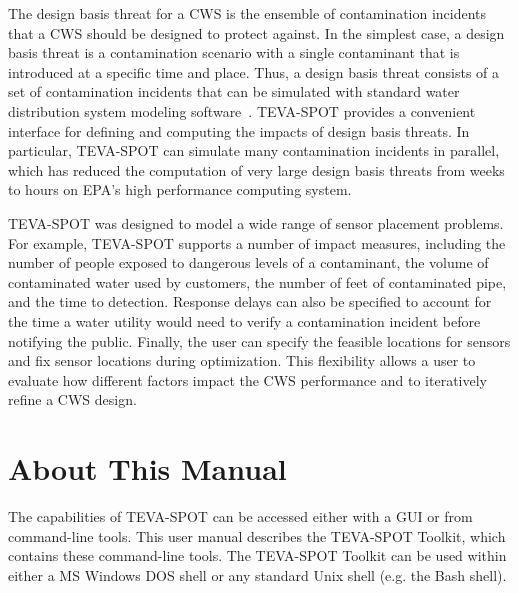 The design basis threat for a CWS is the ensemble of contamination incidents that a CWS should be designed to protect against. In the simplest case, a design basis threat is a contamination scenario with a single contaminant that is introduced at a specific time and place. Thus, a design basis threat consists of a set of contamination incidents that can be simulated with standard water distribution system  modeling software~\cite{EPANET}.  TEVA-\/SPOT provides a convenient interface for defining and computing the impacts of design basis threats. In particular, TEVA-\/SPOT can simulate many contamination incidents in parallel, which has reduced the computation of very large design basis threats from weeks to hours on EPA's high performance computing system.

TEVA-\/SPOT was designed to model a wide range of sensor placement problems. For example, TEVA-\/SPOT supports a number of impact measures, including the number of people exposed to dangerous levels of a contaminant, the volume of contaminated water used by customers, the number of feet of contaminated pipe, and the time to detection. Response delays can also be specified to account for the time a water utility would need to verify a contamination incident before notifying the public. Finally, the user can specify the feasible locations for sensors and fix sensor locations during optimization. This flexibility allows a user to evaluate how different factors impact the CWS performance and to iteratively refine a CWS design.

\section{About This Manual}\label{intro_introAbout}
The capabilities of TEVA-\/SPOT can be accessed either with a GUI or from command-\/line tools. This user manual describes the TEVA-\/SPOT Toolkit, which contains these command-\/line tools. The TEVA-\/SPOT Toolkit can be used within either a MS Windows DOS shell or any standard Unix shell (e.g. the Bash shell).

